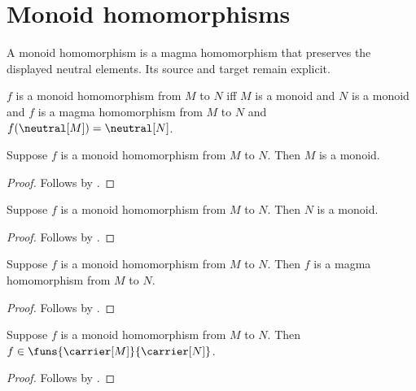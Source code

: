 


\section{Monoid homomorphisms}

A monoid homomorphism is a magma homomorphism that preserves the displayed
neutral elements.  Its source and target remain explicit.

\begin{definition}\label{monoid_hom}
    $f$ is a monoid homomorphism from $M$ to $N$ iff
        $M$ is a monoid and $N$ is a monoid and
        $f$ is a magma homomorphism from $M$ to $N$ and
        $f(\neutral[M])=\neutral[N]$.
\end{definition}

\begin{proposition}\label{monoid_hom_source_monoid}
    Suppose $f$ is a monoid homomorphism from $M$ to $N$.
    Then $M$ is a monoid.
\end{proposition}
\begin{proof}
    Follows by .
\end{proof}

\begin{proposition}\label{monoid_hom_target_monoid}
    Suppose $f$ is a monoid homomorphism from $M$ to $N$.
    Then $N$ is a monoid.
\end{proposition}
\begin{proof}
    Follows by .
\end{proof}

\begin{proposition}\label{monoid_hom_is_magma_hom}
    Suppose $f$ is a monoid homomorphism from $M$ to $N$.
    Then $f$ is a magma homomorphism from $M$ to $N$.
\end{proposition}
\begin{proof}
    Follows by .
\end{proof}

\begin{proposition}\label{monoid_hom_type}
    Suppose $f$ is a monoid homomorphism from $M$ to $N$.
    Then $f\in\funs{\carrier[M]}{\carrier[N]}$.
\end{proposition}
\begin{proof}
    Follows by
        .
\end{proof}

